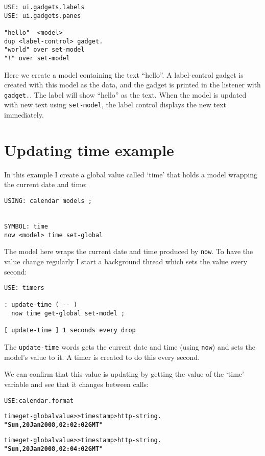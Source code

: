 \begin{verbatim}
USE: ui.gadgets.labels
USE: ui.gadgets.panes

"hello"  <model> 
dup <label-control> gadget.
"world" over set-model
"!" over set-model
\end{verbatim}

Here we create a model containing the text ``hello''. A label-control gadget is created with this model as the data, and the gadget is printed in the listener with \verb|gadget.|. The label will show ``hello'' as the text. When the model is updated with new text using \verb|set-model|, the label control displays the new text immediately.

\section{Updating time example}

In this example I create a global value called `time' that holds a
model wrapping the current date and time:

\begin{verbatim}
USING: calendar models ;


SYMBOL: time
now <model> time set-global
\end{verbatim}

The model here wraps the current date and time produced by
\verb|now|. To have the value change regularly I start a background
thread which sets the value every second:

\begin{verbatim}
USE: timers

: update-time ( -- )
  now time get-global set-model ;

[ update-time ] 1 seconds every drop
\end{verbatim}

The \verb|update-time| words gets the current date and time (using \verb|now|)
and sets the model's value to it. A timer is created to do this every second.

We can confirm that this value is updating by getting the value of
the `time' variable and see that it changes between calls:

\begin{alltt}
USE: calendar.format

time get-global value>> timestamp>http-string .
  \textbf{"Sun, 20 Jan 2008, 02:02:02 GMT"} 

time get-global value>> timestamp>http-string .
  \textbf{"Sun, 20 Jan 2008, 02:04:02 GMT" }
\end{alltt}

